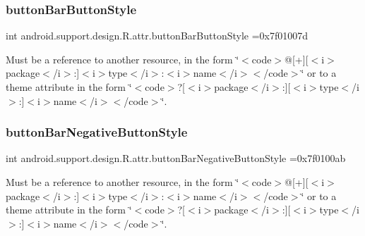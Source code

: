 \subsubsection{\texorpdfstring{button\+Bar\+Button\+Style}{buttonBarButtonStyle}}
{\footnotesize\ttfamily int android.\+support.\+design.\+R.\+attr.\+button\+Bar\+Button\+Style =0x7f01007d\hspace{0.3cm}{\ttfamily [static]}}

Must be a reference to another resource, in the form \char`\"{}$<$code$>$@\mbox{[}+\mbox{]}\mbox{[}$<$i$>$package$<$/i$>$\+:\mbox{]}$<$i$>$type$<$/i$>$\+:$<$i$>$name$<$/i$>$$<$/code$>$\char`\"{} or to a theme attribute in the form \char`\"{}$<$code$>$?\mbox{[}$<$i$>$package$<$/i$>$\+:\mbox{]}\mbox{[}$<$i$>$type$<$/i$>$\+:\mbox{]}$<$i$>$name$<$/i$>$$<$/code$>$\char`\"{}. \mbox{\label{classandroid_1_1support_1_1design_1_1R_1_1attr_abeb21f0b19ac0953b2c1e22f89ab62bc}} 
\subsubsection{\texorpdfstring{button\+Bar\+Negative\+Button\+Style}{buttonBarNegativeButtonStyle}}
{\footnotesize\ttfamily int android.\+support.\+design.\+R.\+attr.\+button\+Bar\+Negative\+Button\+Style =0x7f0100ab\hspace{0.3cm}{\ttfamily [static]}}

Must be a reference to another resource, in the form \char`\"{}$<$code$>$@\mbox{[}+\mbox{]}\mbox{[}$<$i$>$package$<$/i$>$\+:\mbox{]}$<$i$>$type$<$/i$>$\+:$<$i$>$name$<$/i$>$$<$/code$>$\char`\"{} or to a theme attribute in the form \char`\"{}$<$code$>$?\mbox{[}$<$i$>$package$<$/i$>$\+:\mbox{]}\mbox{[}$<$i$>$type$<$/i$>$\+:\mbox{]}$<$i$>$name$<$/i$>$$<$/code$>$\char`\"{}. \mbox{\label{classandroid_1_1support_1_1design_1_1R_1_1attr_a054db1c73ad10e31005b962d4ae8d094}} 
